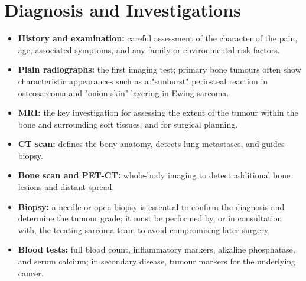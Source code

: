 \section*{Diagnosis and Investigations}
\begin{itemize}
    \item \textbf{History and examination:} careful assessment of the character of the pain, age, associated symptoms, and any family or environmental risk factors.
    \item \textbf{Plain radiographs:} the first imaging test; primary bone tumours often show characteristic appearances such as a "sunburst" periosteal reaction in osteosarcoma and "onion-skin" layering in Ewing sarcoma.
    \item \textbf{MRI:} the key investigation for assessing the extent of the tumour within the bone and surrounding soft tissues, and for surgical planning.
    \item \textbf{CT scan:} defines the bony anatomy, detects lung metastases, and guides biopsy.
    \item \textbf{Bone scan and PET-CT:} whole-body imaging to detect additional bone lesions and distant spread.
    \item \textbf{Biopsy:} a needle or open biopsy is essential to confirm the diagnosis and determine the tumour grade; it must be performed by, or in consultation with, the treating sarcoma team to avoid compromising later surgery.
    \item \textbf{Blood tests:} full blood count, inflammatory markers, alkaline phosphatase, and serum calcium; in secondary disease, tumour markers for the underlying cancer.
\end{itemize}

